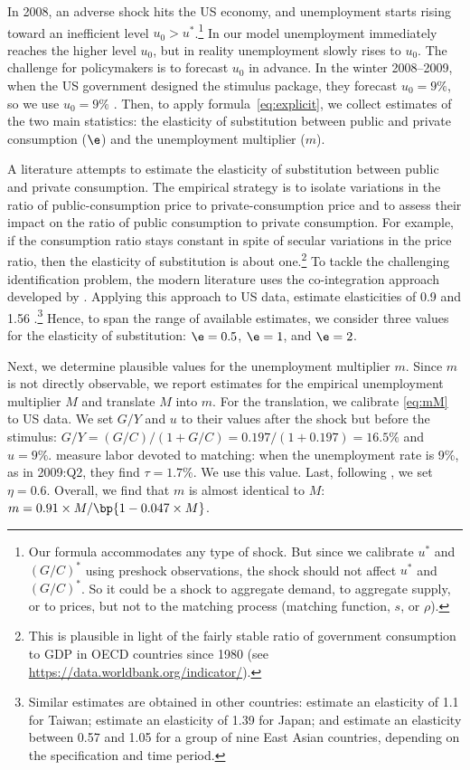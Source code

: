 \documentclass[letterpaper,12pt,leqno]{article}
\begin{document}
\begin{bibunit}
In 2008, an adverse shock hits the US economy, and unemployment starts rising toward an inefficient level $u_{0}>u^{*}$.\footnote{Our formula accommodates any type of shock. But since we calibrate $u^*$ and $(G/C)^*$ using preshock observations, the shock should not affect $u^*$ and $(G/C)^*$. So it could be a shock to aggregate demand, to aggregate supply, or to prices, but not to the matching process (matching function, $s$, or $\rho$).} In our model unemployment immediately reaches the higher level $u_{0}$, but in reality unemployment slowly rises to $u_{0}$. The challenge for policymakers is to forecast $u_{0}$ in advance. In the winter 2008--2009, when the US government designed the stimulus package, they forecast $u_{0}=9\%$, so we use $u_{0}=9\%$ . Then, to apply formula~\eqref{eq:explicit}, we collect estimates of the two main statistics: the elasticity of substitution between public and private consumption ($\e$) and the unemployment multiplier ($m$). 

A literature attempts to estimate the elasticity of substitution between public and private consumption. The empirical strategy is to isolate variations in the ratio of public-consumption price to private-consumption price and to assess their impact on the ratio of public consumption to private consumption. For example, if the consumption ratio stays constant in spite of secular variations in the price ratio, then the elasticity of substitution is about one.\footnote{This is plausible in light of the fairly stable ratio of government consumption to GDP in OECD countries since 1980 (see \url{https://data.worldbank.org/indicator/}).} To tackle the challenging identification problem, the modern literature uses the co-integration approach developed by . Applying this approach to US data,  estimate elasticities of 0.9 and 1.56 .\footnote{Similar estimates are obtained in other countries:  estimate an elasticity of 1.1 for Taiwan;  estimate an elasticity of 1.39 for Japan; and  estimate an elasticity between 0.57 and 1.05 for a group of nine East Asian countries, depending on the specification and time period.} Hence, to span the range of available estimates, we consider three values for the elasticity of substitution: $\e=0.5$, $\e=1$, and $\e=2$.

Next, we determine plausible values for the unemployment multiplier $m$. Since $m$ is not directly observable, we report estimates for the empirical unemployment multiplier $M$ and translate $M$ into $m$. For the translation, we calibrate \eqref{eq:mM} to US data. We set $G/Y$ and $u$ to their values after the shock but before the stimulus: $G/Y=(G/C)/(1+G/C)=0.197/(1+0.197)=16.5\%$ and $u=9\%$.  measure labor devoted to matching: when the unemployment rate is 9\%, as in 2009:Q2, they find $\tau=1.7\%$. We use this value. Last, following , we set $\eta=0.6$. Overall, we find that $m$ is almost identical to $M$: $m= 0.91 \times M/\bp{1- 0.047\times M}$.


\end{bibunit}
\end{document}
